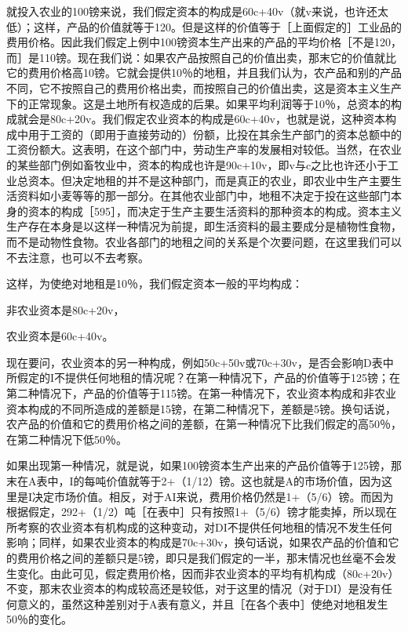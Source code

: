 就投入农业的100镑来说，我们假定资本的构成是60c+40v（就v来说，也许还太低）；这样，产品的价值就等于120。但是这样的价值等于［上面假定的］工业品的费用价格。因此我们假定上例中100镑资本生产出来的产品的平均价格［不是120，而］是110镑。现在我们说：如果农产品按照自己的价值出卖，那末它的价值就比它的费用价格高10镑。它就会提供10％的地租，并且我们认为，农产品和别的产品不同，它不按照自己的费用价格出卖，而按照自己的价值出卖，这是资本主义生产下的正常现象。这是土地所有权造成的后果。如果平均利润等于10％，总资本的构成就会是80c+20v。我们假定农业资本的构成是60c+40v，也就是说，这种资本构成中用于工资的（即用于直接劳动的）份额，比投在其余生产部门的资本总额中的工资份额大。这表明，在这个部门中，劳动生产率的发展相对较低。当然，在农业的某些部门例如畜牧业中，资本的构成也许是90c+10v，即v与c之比也许还小于工业总资本。但决定地租的并不是这种部门，而是真正的农业，即农业中生产主要生活资料如小麦等等的那一部分。在其他农业部门中，地租不决定于投在这些部门本身的资本的构成［595］，而决定于生产主要生活资料的那种资本的构成。资本主义生产存在本身是以这样一种情况为前提，即生活资料的最主要成分是植物性食物，而不是动物性食物。农业各部门的地租之间的关系是个次要问题，在这里我们可以不去注意，也可以不去考察。

这样，为使绝对地租是10％，我们假定资本一般的平均构成：

非农业资本是80c+20v，

农业资本是60c+40v。

现在要问，农业资本的另一种构成，例如50c+50v或70c+30v，是否会影响D表中所假定的I不提供任何地租的情况呢？在第一种情况下，产品的价值等于125镑；在第二种情况下，产品的价值等于115镑。在第一种情况下，农业资本构成和非农业资本构成的不同所造成的差额是15镑，在第二种情况下，差额是5镑。换句话说，农产品的价值和它的费用价格之间的差额，在第一种情况下比我们假定的高50％，在第二种情况下低50％。

如果出现第一种情况，就是说，如果100镑资本生产出来的产品价值等于125镑，那末在A表中，I的每吨价值就等于2+（1/12）镑。这也就是A的市场价值，因为这里是I决定市场价值。相反，对于AI来说，费用价格仍然是1+（5/6）镑。而因为根据假定，292+（1/2）吨［在表中］只有按照1+（5/6）镑才能卖掉，所以现在所考察的农业资本有机构成的这种变动，对DI不提供任何地租的情况不发生任何影响；同样，如果农业资本的构成是70c+30v，换句话说，如果农产品的价值和它的费用价格之间的差额只是5镑，即只是我们假定的一半，那末情况也丝毫不会发生变化。由此可见，假定费用价格，因而非农业资本的平均有机构成（80c+20v）不变，那末农业资本的构成较高还是较低，对于这里的情况（对于DI）是没有任何意义的，虽然这种差别对于A表有意义，并且［在各个表中］使绝对地租发生50％的变化。

